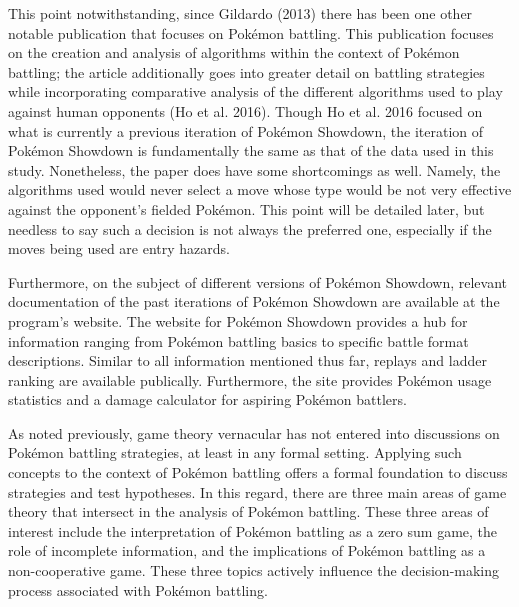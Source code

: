 \documentclass[12pt,twoside]{reedthesis}
\begin{document}
  This point notwithstanding, since Gildardo (2013) there has been one
  other notable publication that focuses on Pokémon battling. This
  publication focuses on the creation and analysis of algorithms within
  the context of Pokémon battling; the article additionally goes into
  greater detail on battling strategies while incorporating comparative
  analysis of the different algorithms used to play against human
  opponents (Ho et al. 2016). Though Ho et al. 2016 focused on what is
  currently a previous iteration of Pokémon Showdown, the iteration of
  Pokémon Showdown is fundamentally the same as that of the data used in
  this study. Nonetheless, the paper does have some shortcomings as well.
  Namely, the algorithms used would never select a move whose type would
  be not very effective against the opponent's fielded Pokémon. This point
  will be detailed later, but needless to say such a decision is not
  always the preferred one, especially if the moves being used are entry
  hazards.
  
  Furthermore, on the subject of different versions of Pokémon Showdown,
  relevant documentation of the past iterations of Pokémon Showdown are
  available at the program's website. The website for Pokémon Showdown
  provides a hub for information ranging from Pokémon battling basics to
  specific battle format descriptions. Similar to all information
  mentioned thus far, replays and ladder ranking are available publically.
  Furthermore, the site provides Pokémon usage statistics and a damage
  calculator for aspiring Pokémon battlers.
  
  As noted previously, game theory vernacular has not entered into
  discussions on Pokémon battling strategies, at least in any formal
  setting. Applying such concepts to the context of Pokémon battling
  offers a formal foundation to discuss strategies and test hypotheses. In
  this regard, there are three main areas of game theory that intersect in
  the analysis of Pokémon battling. These three areas of interest include
  the interpretation of Pokémon battling as a zero sum game, the role of
  incomplete information, and the implications of Pokémon battling as a
  non-cooperative game. These three topics actively influence the
  decision-making process associated with Pokémon battling.
  
\end{document}
